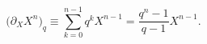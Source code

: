 \begin{equation*}
\bigl(\partial_X X^n\bigr)_q\equiv \sum_{k=0}^{n-1}q^k X^{n-1}
=\frac{q^n-1}{q-1}X^{n-1}. \nonumber
\end{equation*}

